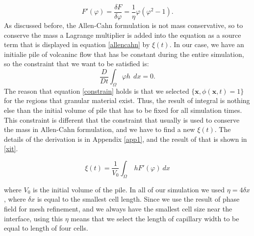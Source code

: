 \documentclass[letterpaper,10pt]{article}
\begin{document}
\begin{equation} 
\label{fprime}
F'(\varphi)= \frac{\delta F}{\delta \varphi} = \frac{1}{\eta} \varphi (\varphi^2 -1).
\end{equation}
As discussed before, the Allen-Cahn formulation is not mass conservative, so to conserve the mass a Lagrange multiplier is added into 
the equation as a source term that is displayed in equation \eqref{allencahn} by $\xi(t)$. In our case, we have an initialie pile of volcaninc flow that has be constant during the entire simulation, so the constraint that we want to be satisfied is:
\begin{equation} 
\label{constrain}
\frac{D}{Dt} \int_\Omega \varphi h \ \ dx= 0.
\end{equation}
The reason that equation \eqref{constrain} holds is that we selected $ \lbrace \textbf{x}, \phi(\textbf{x},t)= 1 \rbrace  $ for the regions that granular material exist. Thus, the result of integral is nothing else than the initial volume of pile that has to be fixed for all simulation times. This constraint is different that the constraint that usually is used to conserve the mass in Allen-Cahn formulation, and we have to find a new $\xi(t)$. The details of the derivation is in Appendix \ref{app1}, and the result of that is shown in \eqref{xit}.

\begin{equation} 
\label{xit}
\xi(t) = \frac{1}{V_0} \int_\Omega\  h F'(\varphi) \ dx
\end{equation}
 
where  $ V_0 $ is the initial volume of the pile.
In all of our simulation we used $\eta=4\delta x$, where $\delta x$ is equal to the smallest cell length. Since we use the result of phase field for mesh refinement, and we always have the smallest cell size near the interface, using this $\eta$ means that we select the length of capillary width to be equal to length of four cells.
% 
\end{document}
